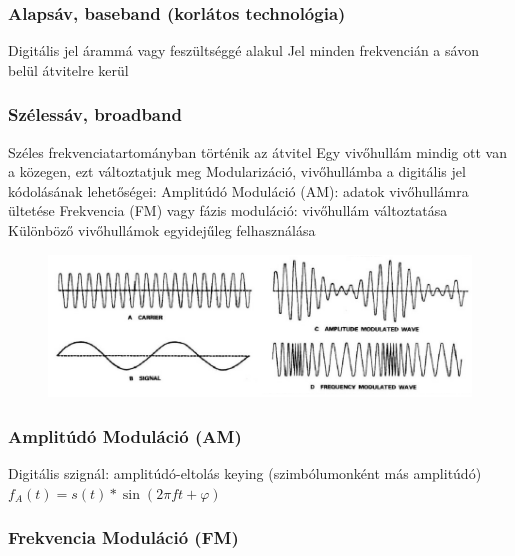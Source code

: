 \documentclass[12pt,a4paper]{article}
\begin{document}
\subsubsection{Alapsáv, baseband (korlátos technológia)}

\begin{outline}
	\1 Digitális jel árammá vagy feszültséggé alakul
	\1 Jel minden frekvencián a sávon belül átvitelre kerül
\end{outline}

\pagebreak

\subsubsection{Szélessáv, broadband}

\begin{outline}
	\1 Széles frekvenciatartományban történik az átvitel
	\1 Egy vivőhullám mindig ott van a közegen, ezt változtatjuk meg
	\1 Modularizáció, vivőhullámba a digitális jel kódolásának lehetőségei:
		\2 Amplitúdó Moduláció (AM): adatok vivőhullámra ültetése
		\2 Frekvencia (FM) vagy fázis moduláció: vivőhullám változtatása
		\2 Különböző vivőhullámok egyidejűleg felhasználása
\end{outline}

\begin{figure}[h!]
	\centering
	\includegraphics[width=1\linewidth]{carrier-signal-am-fm}
\end{figure}

\subsubsection{Amplitúdó Moduláció (AM)}

\begin{outline}
	\1 Digitális szignál: amplitúdó-eltolás keying (szimbólumonként más amplitúdó)
	\1 $f_A(t) = s(t)*\sin(2 \pi f t + \varphi)$
\end{outline}

\subsubsection{Frekvencia Moduláció (FM)}
\end{document}
